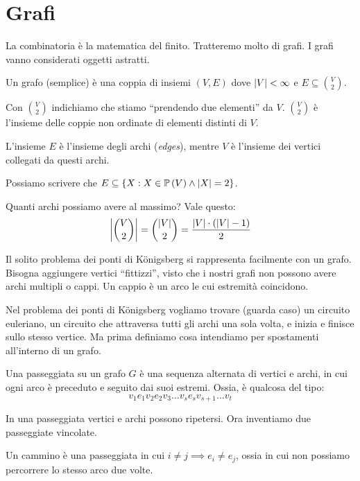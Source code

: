 
\chapter{Grafi}

La combinatoria \`e la matematica del finito.
Tratteremo molto di grafi.
I grafi vanno considerati oggetti astratti.

\begin{defn}[Grafo]
	Un grafo (semplice) \`e una coppia di insiemi $(V,E)$ dove $\left\lvert{V}\right\rvert < \infty$ e $E \subseteq \binom{V}{2}$.
\end{defn}
Con $\binom{V}{2}$ indichiamo che stiamo ``prendendo due elementi'' da $V$.
$\binom{V}{2}$ \`e l'insieme delle coppie non ordinate di elementi distinti di $V$.

L'insieme $E$ \`e l'insieme degli archi (\emph{edges}), mentre $V$ \`e l'insieme dei vertici collegati da questi archi.

Possiamo scrivere che $E \subseteq \{ X : X \in \mathbb{P} \left( {V} \right) \land \left\lvert{X}\right\rvert = 2 \}$.

Quanti archi possiamo avere al massimo?
Vale questo:
\[
	\left\lvert{\binom{V}{2}}\right\rvert = \binom{\left\lvert{V}\right\rvert}{2} = \frac{\left\lvert{V}\right\rvert \cdot \left( \left\lvert{V}\right\rvert - 1 \right)}{2}
\]

Il solito problema dei ponti di K\"onigsberg si rappresenta facilmente con un grafo.
Bisogna aggiungere vertici ``fittizzi'', visto che i nostri grafi non possono avere archi multipli o cappi.
Un cappio \`e un arco le cui estremit\`a coincidono.

Nel problema dei ponti di K\"onigsberg vogliamo trovare (guarda caso) un circuito euleriano, un circuito che attraversa tutti gli archi una sola volta, e inizia e finisce sullo stesso vertice.
Ma prima definiamo cosa intendiamo per spostamenti all'interno di un grafo.

\begin{defn}
	Una passeggiata su un grafo $G$ \`e una sequenza alternata di vertici e archi, in cui ogni arco \`e preceduto e seguito dai suoi estremi.
	Ossia, \`e qualcosa del tipo:
	\[
		v_1 e_1 v_2 e_2 v_3 \dots v_s e_s v_{s+1} \dots v_t
	\]
\end{defn}
In una passeggiata vertici e archi possono ripetersi.
Ora inventiamo due passeggiate vincolate.

\begin{defn}
	Un cammino \`e una passeggiata in cui $i \neq j \implies e_i \neq e_j$, ossia in cui non possiamo percorrere lo stesso arco due volte.
\end{defn}

